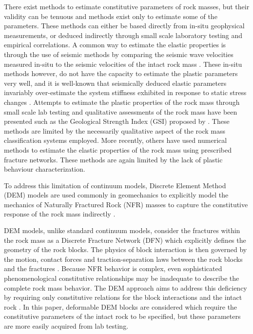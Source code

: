 There exist methods to estimate constitutive parameters of rock masses, but their validity can be tenuous and methods exist only to estimate some of the parameters. These methods can either be based directly from in-situ geophysical measurements, or deduced indirectly through small scale laboratory testing and empirical correlations. A common way to estimate the elastic properties is through the use of seismic methods by comparing the seismic wave velocities measured in-situ to the seismic velocities of the intact rock mass \citep{SJOGREN_1979}. These in-situ methods however, do not have the capacity to estimate the plastic parameters very well, and it is well-known that seismically deduced elastic parameters invariably over-estimate the system stiffness exhibited in response to static stress changes \citep{Barton_2006}. Attempts to estimate the plastic properties of the rock mass through small scale lab testing and qualitative assessments of the rock mass have been presented such as the Geological Strength Index (GSI) proposed by \citet{Hoek_1997}. These methods are limited by the necessarily qualitative aspect of the rock mass classification systems employed. More recently, others \citep{Min_2003,Chen_2012,Bidgoli_2013} have used numerical methods to estimate the elastic properties of the rock mass using prescribed fracture networks. These methods are again limited by the lack of plastic behaviour characterization. 

To address this limitation of continuum models, Discrete Element Method (DEM) models are used commonly in geomechanics to explicitly model the mechanics of Naturally Fractured Rock (NFR) masses to capture the constitutive response of the rock mass indirectly \citep{jing_review_2003}. 

DEM models, unlike standard continuum models, consider the fractures within the rock mass as a Discrete Fracture Network (DFN) which explicitly defines the geometry of the rock blocks. The physics of block interaction is then governed by the motion, contact forces and traction-separation laws between the rock blocks and the fractures \citep{Thallak_1990}. Because NFR behavior is complex, even sophisticated phenomenological constitutive relationships may be inadequate to describe the complete rock mass behavior. The DEM approach aims to address this deficiency by requiring only constitutive relations for the block interactions and the intact rock \citep{Barbosa_1990}. In this paper,  deformable DEM blocks are considered which require the constitutive parameters of the intact rock to be specified, but these parameters are more easily acquired from lab testing. 


